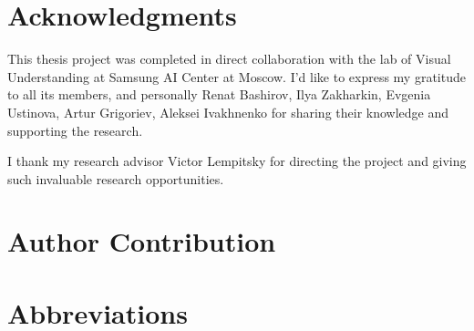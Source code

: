 \section*{\centering Acknowledgments}
This thesis project was completed in direct collaboration with the lab of Visual Understanding at Samsung AI Center at Moscow. I'd like to express my gratitude to all its members, and personally Renat Bashirov, Ilya Zakharkin, Evgenia Ustinova, Artur Grigoriev, Aleksei Ivakhnenko for sharing their knowledge and supporting the research. 

I thank my research advisor Victor Lempitsky for directing the project and giving such invaluable research opportunities.

\section*{\centering Author Contribution}

\newpage
\section*{\centering Abbreviations}


